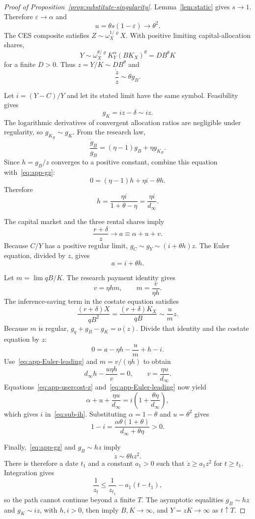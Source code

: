 \begin{proof}[Proof of Proposition~\ref{prop:substitute-singularity}]
Lemma~\ref{lem:static} gives $s\to1$. Therefore
$\varepsilon\to\alpha$ and
\[
 u=\theta s(1-\varepsilon)\longrightarrow\theta^2.
\]
The CES composite satisfies
$Z\sim\omega_X^{1/\varrho}X$. With positive limiting capital-allocation shares,
\[
 Y\sim\omega_X^{\theta/\varrho}
 K_Y^\alpha(BK_X)^\theta
 =DB^\theta K
\]
for a finite $D>0$. Thus $z=Y/K\sim DB^\theta$ and
\begin{equation}
 \frac{\dot z}{z}\sim\theta g_B.
 \label{eq:app-gz}
\end{equation}

Let $i=(Y-C)/Y$ and let its stated limit have the same symbol. Feasibility gives
\[
 g_K=iz-\delta\sim iz.
\]
The logarithmic derivatives of convergent allocation ratios are negligible under regularity, so $g_{K_R}\sim g_K$. From the research law,
\[
 \frac{\dot g_B}{g_B}
 =(\eta-1)g_B+\eta g_{K_R}.
\]
Since $h=g_B/z$ converges to a positive constant, combine this equation with~\eqref{eq:app-gz}:
\[
 0=(\eta-1)h+\eta i-\theta h.
\]
Therefore
\[
 h=\frac{\eta i}{1+\theta-\eta}
 =\frac{\eta i}{d_\infty}.
\]

The capital market and the three rental shares imply
\begin{equation}
 \frac{r+\delta}{z}\longrightarrow a\equiv\alpha+u+v.
 \label{eq:app-usercost-z}
\end{equation}
Because $C/Y$ has a positive regular limit,
$g_C\sim g_Y\sim(i+\theta h)z$. The Euler equation, divided by $z$, gives
\begin{equation}
 a=i+\theta h.
 \label{eq:app-Euler-leading}
\end{equation}

Let $m=\lim qB/K$. The research payment identity gives
\[
 v=\eta hm,\qquad m=\frac{v}{\eta h}.
\]
The inference-saving term in the costate equation satisfies
\[
 \frac{(r+\delta)X}{qB^2}
 =\frac{(r+\delta)K_X}{qB}
 \sim\frac{u}{m}z.
\]
Because $m$ is regular, $g_q+g_B-g_K=o(z)$. Divide that identity and the costate equation by $z$:
\[
 0=a-\eta h-\frac{u}{m}+h-i.
\]
Use~\eqref{eq:app-Euler-leading} and $m=v/(\eta h)$ to obtain
\[
 d_\infty h-\frac{u\eta h}{v}=0,
\qquad
 v=\frac{\eta u}{d_\infty}.
\]
Equations~\eqref{eq:app-usercost-z} and~\eqref{eq:app-Euler-leading} now yield
\[
 \alpha+u+\frac{\eta u}{d_\infty}
 =i\left(1+\frac{\theta\eta}{d_\infty}\right),
\]
which gives $i$ in~\eqref{eq:sub-ih}. Substituting
$\alpha=1-\theta$ and $u=\theta^2$ gives
\[
 1-i
 =\frac{\alpha\theta(1+\theta)}
 {d_\infty+\theta\eta}>0.
\]

Finally,~\eqref{eq:app-gz} and $g_B\sim hz$ imply
\[
 \dot z\sim\theta h z^2.
\]
There is therefore a date $t_1$ and a constant $a_1>0$ such that
$\dot z\geq a_1z^2$ for $t\geq t_1$. Integration gives
\[
 \frac{1}{z_t}\leq
 \frac{1}{z_{t_1}}-a_1(t-t_1),
\]
so the path cannot continue beyond a finite $T$. The asymptotic equalities
$g_B\sim hz$ and $g_K\sim iz$, with $h,i>0$, then imply
$B,K\to\infty$, and $Y=zK\to\infty$ as $t\uparrow T$.
\end{proof}

